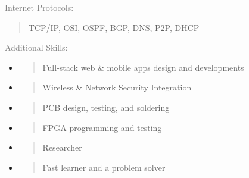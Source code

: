 \documentclass[letterpage]{article}
\begin{document}
\begin{minipage}[t]{0.424\linewidth}
  \vspace{7px}
  \textcolor{gray}{Internet Protocols:}  \\
  \begin{quote}
      \textmd{TCP/IP, OSI, OSPF, BGP, DNS, P2P, DHCP}\\
  \end{quote}

  \vspace{7px}
  \textcolor{gray}{Additional Skills:}  \\
  \begin{itemize}[leftmargin=*,labelindent=0mm,labelsep=0mm]
    \raggedright
  \item
    \begin{quote}
        \textmd{Full-stack web \& mobile apps design and developments}
    \end{quote}
  \item
    \begin{quote}      
        \textmd{Wireless \&  Network Security Integration}
    \end{quote}
  \item
    \begin{quote}
        \textmd{PCB design, testing, and soldering}
    \end{quote}
  \item
    \begin{quote}
        \textmd{FPGA programming and testing}
    \end{quote}
  \item
    \begin{quote}
        \textsf{Researcher}
    \end{quote}
  \item
    \begin{quote}
        \textmd{Fast learner and a problem solver}
    \end{quote}
  \end{itemize}
\end{minipage}
\end{document}
